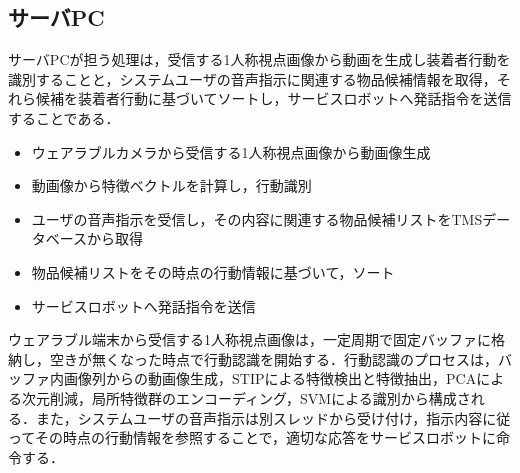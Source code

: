 \subsection{サーバPC}
サーバPCが担う処理は，受信する1人称視点画像から動画を生成し装着者行動を識別することと，システムユーザの音声指示に関連する物品候補情報を取得，それら候補を装着者行動に基づいてソートし，サービスロボットへ発話指令を送信することである．
%
\begin{itemize}
\setlength{\itemsep}{-5pt}
\item{ウェアラブルカメラから受信する1人称視点画像から動画像生成}
\item{動画像から特徴ベクトルを計算し，行動識別}
\item{ユーザの音声指示を受信し，その内容に関連する物品候補リストをTMSデータベースから取得}
\item{物品候補リストをその時点の行動情報に基づいて，ソート}
\item{サービスロボットへ発話指令を送信}
\end{itemize}

ウェアラブル端末から受信する1人称視点画像は，一定周期で固定バッファに格納し，空きが無くなった時点で行動認識を開始する．行動認識のプロセスは，バッファ内画像列からの動画像生成，STIPによる特徴検出と特徴抽出，PCAによる次元削減，局所特徴群のエンコーディング，SVMによる識別から構成される．また，システムユーザの音声指示は別スレッドから受け付け，指示内容に従ってその時点の行動情報を参照することで，適切な応答をサービスロボットに命令する．